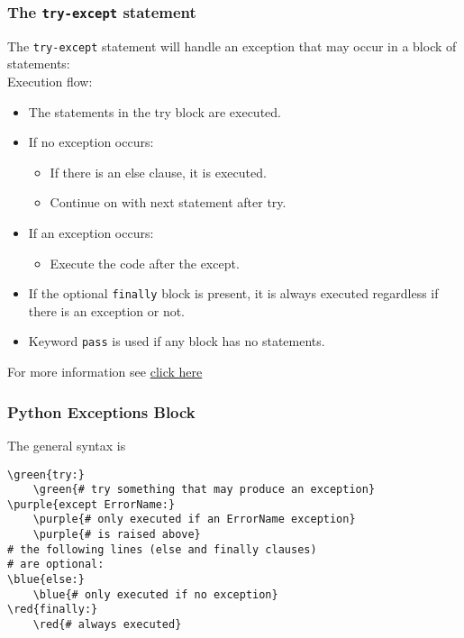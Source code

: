 \documentclass[xcolor=svgnames]{beamer}
\newcommand{\red}[1]{\textcolor{red}{#1}}
\newcommand{\green}[1]{\textcolor{ForestGreen}{#1}}
\newcommand{\blue}[1]{{\textcolor{blue}{#1}}}
\newcommand{\purple}[1]{{\textcolor{purple}{#1}}}
\newcommand{\nl}{\\[1em]}
\newcommand{\ft}[1]{\frametitle{#1}}
\begin{document}
\begin{frame}\ft{The {\tt try-except} statement}
The {\tt try-except} statement will handle an exception that may occur in a  block of statements:\nl

Execution flow:
\begin{itemize}
\item The statements in the try block are executed.
\item If no exception occurs:
\begin{itemize}
\item If there is an else clause, it is executed.
\item Continue on with next statement after try.
\end{itemize}
\item If an exception occurs:
\begin{itemize}
\item Execute the code after the except.
\end{itemize}
\item If the optional {\tt finally} block is present, it is always executed regardless if there is an  exception or not.
\item Keyword {\tt pass} is used if any block has no statements.
\end{itemize}

For more information see \href{https://docs.python.org/3/tutorial/errors.html}{click here}
\end{frame}
%

\begin{frame}[fragile]\ft{Python Exceptions Block}
The general syntax is 
\begin{Verbatim}[xleftmargin=0.1in, commandchars=\\\{\}] 
\green{try:}
    \green{# try something that may produce an exception}
\purple{except ErrorName:}
    \purple{# only executed if an ErrorName exception}
    \purple{# is raised above}
# the following lines (else and finally clauses) 
# are optional:
\blue{else:}
    \blue{# only executed if no exception}
\red{finally:}
    \red{# always executed}
\end{Verbatim}
\end{frame}
\end{document}
